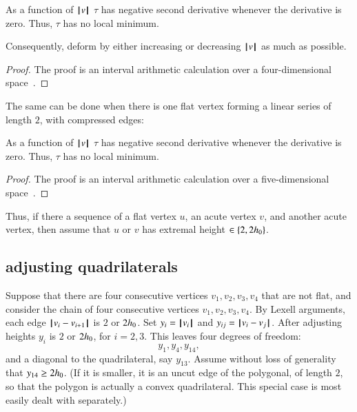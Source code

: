 \begin{lemma} As a function of ${{\hskip0.1em|\hskip-0.15em|\hskip0.1em}v{\hskip0.1em|\hskip-0.15em|\hskip0.1em}}$
 $\tau$ has negative second derivative whenever the derivative is zero.  Thus, $\tau$ has no local minimum.
%
%
\end{lemma}

Consequently,  deform by either increasing or decreasing ${{\hskip0.1em|\hskip-0.15em|\hskip0.1em}v{\hskip0.1em|\hskip-0.15em|\hskip0.1em}}$ as much as possible.  

\begin{proof}
The proof is an interval arithmetic calculation over a four-dimensional space~\cite[cc:d2a]{hales:2009:nonlinear}.  %
\end{proof}


The same can be done when there is one flat vertex forming a linear series of length $2$, with compressed edges:

\begin{lemma}
As a function of ${{\hskip0.1em|\hskip-0.15em|\hskip0.1em}v{\hskip0.1em|\hskip-0.15em|\hskip0.1em}}$
 $\tau$ has negative second derivative whenever the derivative is zero.  Thus, $\tau$ has no local minimum.
\end{lemma}

\begin{proof}
The proof is an interval arithmetic calculation over a five-dimensional space~\cite[cc:d2b]{hales:2009:nonlinear}. %
\end{proof}


Thus, if there a sequence of a flat vertex $u$, an acute vertex $v$, and another acute vertex, then  assume that $u$ or $v$ has extremal height $\in\{2,2{h_0}\}$.
%
%


\subsection{adjusting quadrilaterals}

Suppose that there are four consecutive vertices $v_1,v_2,v_3,v_4$ that are not flat, and consider the chain of four consecutive vertices $v_1,v_2,v_3,v_4$. By Lexell arguments, each edge ${\hskip0.1em|\hskip-0.15em|\hskip0.1em}v_i - v_{i+1}{\hskip0.1em|\hskip-0.15em|\hskip0.1em}$ is $2$ or $2{h_0}$. Set $y_i = {{\hskip0.1em|\hskip-0.15em|\hskip0.1em}v_i{\hskip0.1em|\hskip-0.15em|\hskip0.1em}}$ and $y_{ij} = {\hskip0.1em|\hskip-0.15em|\hskip0.1em}v_i - v_j{\hskip0.1em|\hskip-0.15em|\hskip0.1em}$. After adjusting heights $y_i$ is $2$ or $2{h_0}$, for $i=2,3$. This leaves four degrees of freedom:
$$
y_1,y_4,y_{14},
$$
and a diagonal to the quadrilateral, say $y_{13}$. Assume without loss of generality that  $y_{14}\ge 2{h_0}$.  (If it is smaller, it is an uncut edge of the polygonal, of length $2$, so that the polygon is actually a convex quadrilateral.  This special case is most easily dealt with separately.)
%


